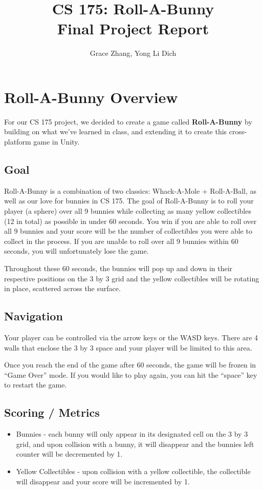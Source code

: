 \documentclass[12pt]{article}
\begin{document}
\title{%
  \textbf{CS 175: Roll-A-Bunny \\
  \large Final Project Report}}
\author{Grace Zhang, Yong Li Dich}
\date{}
\maketitle

\newpage
\tableofcontents


\newpage
 
\section{Roll-A-Bunny Overview}
  For our CS 175 project, we decided to create a game called \textbf{Roll-A-Bunny} by building on what we've learned in class, and extending it to create this cross-platform game in Unity.
\subsection{Goal}
  Roll-A-Bunny is a combination of two classics: Whack-A-Mole + Roll-A-Ball, as well as our love for bunnies in CS 175. The goal of Roll-A-Bunny is to roll your player (a sphere) over all 9 bunnies while collecting as many yellow collectibles (12 in total) as possible in under 60 seconds. 
  You win if you are able to roll over all 9 bunnies and your score will be the number of collectibles you were able to collect in the process. If you are unable to roll over all 9 bunnies within 60 seconds, you will unfortunately lose the game.

  Throughout these 60 seconds, the bunnies will pop up and down in their respective positions on the 3 by 3 grid and the yellow collectibles will be rotating in place, scattered across the surface. 
  
\subsection{Navigation}
  Your player can be controlled via the arrow keys or the WASD keys. 
  There are 4 walls that enclose the 3 by 3 space and your player will be limited to this area. 

  Once you reach the end of the game after 60 seconds, the game will be frozen in ``Game Over'' mode. If you would like to play again, you can hit the ``space'' key to restart the game.

\subsection{Scoring / Metrics}
\begin{itemize}
  \item Bunnies - each bunny will only appear in its designated cell on the 3 by 3 grid, and upon collision with a bunny, it will disappear and the bunnies left counter will be decremented by 1. 
  \item Yellow Collectibles - upon collision with a yellow collectible, the collectible will disappear and your score will be incremented by 1.
\end{itemize}
\end{document}
